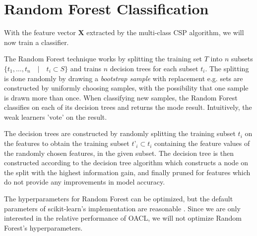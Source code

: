 \section{Random Forest Classification}\label{sec:randomforest}
With the feature vector $\mathbf{X}$ extracted by the multi-class CSP algorithm, we will now train a classifier.

The Random Forest technique works by splitting the training set $T$ into $n$ subsets $\{t_1,…,t_n \quad | \quad t_i \subset S\}$ and trains $n$ decision trees for each subset $t_i$. The splitting is done randomly by drawing a \emph{bootstrap sample} with replacement e.g. sets are constructed by uniformly choosing samples, with the possibility that one sample is drawn more than once. When classifying new samples, the Random Forest classifies on each of its decision trees and returns the mode result. Intuitively, the weak learners 'vote' on the result.

The decision trees are constructed by randomly splitting the training subset $t_i$ on the features to obtain the training subset $t’_i \subset t_i$ containing the feature values of the randomly chosen features, in the given subset. The decision tree is then constructed according to the decision tree algorithm which constructs a node on the split with the highest information gain, and finally pruned for features which do not provide any improvements in model accuracy.

The hyperparameters for Random Forest can be optimized, but the default parameters of scikit-learn's implementation are reasonable \citep{bernard2009influence}. Since we are only interested in the relative performance of OACL, we will not optimize Random Forest's hyperparameters.